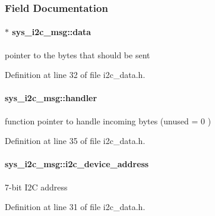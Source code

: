 \subsubsection{Field Documentation}
\hypertarget{structsys__i2c__msg_a93aff6118afb10c8c7ca0401d3ee41e5}{}
\paragraph[{data}]{$\ast$ sys\+\_\+i2c\+\_\+msg\+::data}\label{structsys__i2c__msg_a93aff6118afb10c8c7ca0401d3ee41e5}
pointer to the bytes that should be sent 

Definition at line 32 of file i2c\+\_\+data.\+h.

\hypertarget{structsys__i2c__msg_af659ffc0b34b155664e99fafc6a6cc5f}{}
\paragraph[{handler}]{ sys\+\_\+i2c\+\_\+msg\+::handler}\label{structsys__i2c__msg_af659ffc0b34b155664e99fafc6a6cc5f}
function pointer to handle incoming bytes (unused = 0 ) 

Definition at line 35 of file i2c\+\_\+data.\+h.

\hypertarget{structsys__i2c__msg_a0657e58d9f887db8a031ad86e7fb8fd7}{}
\paragraph[{i2c\+\_\+device\+\_\+address}]{ sys\+\_\+i2c\+\_\+msg\+::i2c\+\_\+device\+\_\+address}\label{structsys__i2c__msg_a0657e58d9f887db8a031ad86e7fb8fd7}
7-\/bit I2\+C address 

Definition at line 31 of file i2c\+\_\+data.\+h.

\hypertarget{structsys__i2c__msg_a92073f759594ee543835f8ad73031e11}{}
